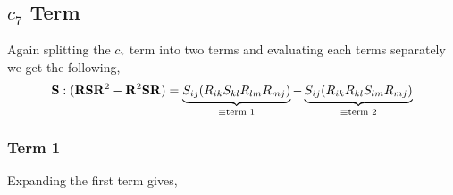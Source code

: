 \newpage
\subsection{$c_7$ Term}
Again splitting the $c_{7}$ term into two terms and evaluating each terms
separately we get the following,
\begin{equation}
    \mathbf{S} : (\mathbf{R} \mathbf{S} \mathbf{R}^2 - \mathbf{R}^2 \mathbf{S} \mathbf{R}) =
                \underbrace{ S_{ij} (R_{ik} S_{kl} R_{lm} R_{mj})}_{\equiv \text{term 1}} - 
                \underbrace{ S_{ij} (R_{ik} R_{kl} S_{lm} R_{mj})}_{\equiv \text{term 2}}
\end{equation}
\subsubsection{Term 1}
Expanding the first term gives,
